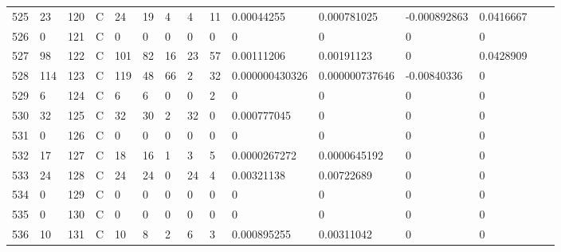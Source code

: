 \begin{longtable}{lllllllllllllll}
	525 & 23                & 120 & C   & 24                & 19                & 4                 & 4    & 11         & 0.00044255     & 0.000781025    & -0.000892863  & 0.0416667    \\
	526 & 0                 & 121 & C   & 0                 & 0                 & 0                 & 0    & 0          & 0              & 0              & 0             & 0            \\
	527 & 98                & 122 & C   & 101               & 82                & 16                & 23   & 57         & 0.00111206     & 0.00191123     & 0             & 0.0428909    \\
	528 & 114               & 123 & C   & 119               & 48                & 66                & 2    & 32         & 0.000000430326 & 0.000000737646 & -0.00840336   & 0            \\
	529 & 6                 & 124 & C   & 6                 & 6                 & 0                 & 0    & 2          & 0              & 0              & 0             & 0            \\
	530 & 32                & 125 & C   & 32                & 30                & 2                 & 32   & 0          & 0.000777045    & 0              & 0             & 0            \\
	531 & 0                 & 126 & C   & 0                 & 0                 & 0                 & 0    & 0          & 0              & 0              & 0             & 0            \\
	532 & 17                & 127 & C   & 18                & 16                & 1                 & 3    & 5          & 0.0000267272   & 0.0000645192   & 0             & 0            \\
	533 & 24                & 128 & C   & 24                & 24                & 0                 & 24   & 4          & 0.00321138     & 0.00722689     & 0             & 0            \\
	534 & 0                 & 129 & C   & 0                 & 0                 & 0                 & 0    & 0          & 0              & 0              & 0             & 0            \\
	535 & 0                 & 130 & C   & 0                 & 0                 & 0                 & 0    & 0          & 0              & 0              & 0             & 0            \\
	536 & 10                & 131 & C   & 10                & 8                 & 2                 & 6    & 3          & 0.000895255    & 0.00311042     & 0             & 0            \\

\end{longtable}
